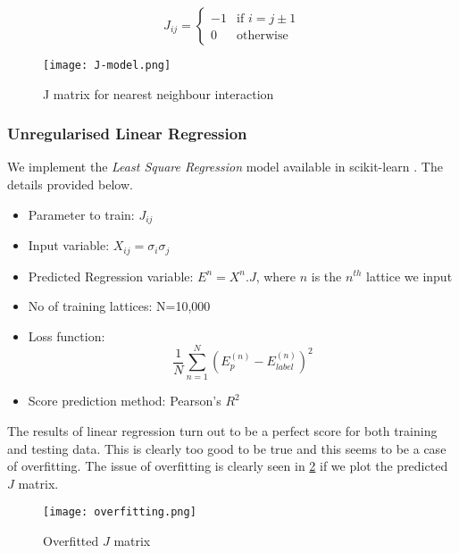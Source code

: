 \begin{equation*}
    J_{ij} = \left\{
        \begin{array}{ll}
            -1 & \mbox{if } i = j \pm 1\\
            0 & \mbox{otherwise}
        \end{array}
    \right.
\end{equation*}

\begin{figure}[H]
    \centering
    \texttt{[image: J-model.png]}
    \caption{J matrix for nearest neighbour interaction}
    \label{fig:j-matrix}
\end{figure}

\subsubsection{Unregularised Linear Regression}

We implement the \emph{Least Square Regression} model available in scikit-learn \cite{alpaydin2020introduction}. The details provided below.
\begin{itemize}
    \item Parameter to train: \(J_{ij}\)
    \item Input variable: \(X_{ij}=\sigma_i\sigma_j\)
    \item Predicted Regression variable: \(E^n=X^n.J\), where $n$ is the $n^{th}$ lattice we input
    \item No of training lattices: N=10,000
    \item Loss function:
        \begin{equation*}
           \frac{1}{N} \sum_{n=1}^N(E_p^{(n)}-E_{label}^{(n)})^2
        \end{equation*}
    \item Score prediction method: Pearson's \(R^2\)
\end{itemize}

The results of linear regression turn out to be a perfect score for both training and testing data.
This is clearly too good to be true and this seems to be a case of overfitting.
The issue of overfitting is clearly seen in \cref{fig:overfit} if we plot the predicted $J$ matrix.

\begin{figure}[H]
    \centering
    \texttt{[image: overfitting.png]}
    \caption{Overfitted $J$ matrix}
    \label{fig:overfit}
\end{figure}


